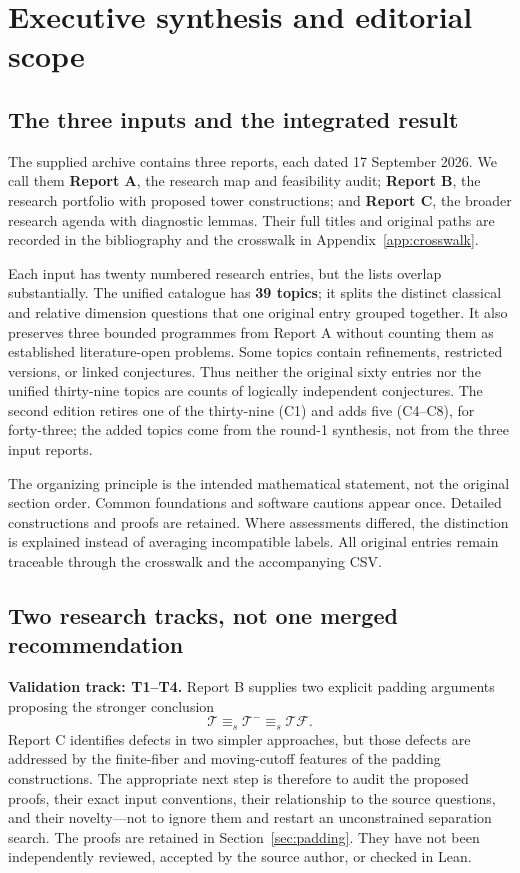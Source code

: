 \documentclass[11pt,a4paper]{article}
\newcommand{\T}{\mathcal T}\newcommand{\TF}{\mathcal{TF}}\newcommand{\Tw}{\mathcal T^{-}}
\theoremstyle{definition}\newtheorem{definition}[theorem]{Definition}
\theoremstyle{remark}\newtheorem{remark}[theorem]{Remark}
\begin{document}
{\small\tableofcontents}
\newpage


\section{Executive synthesis and editorial scope}
\label{sec:scope}
\subsection{The three inputs and the integrated result}
The supplied archive contains three reports, each dated 17 September 2026. We call them \textbf{Report A}, the research map and feasibility audit; \textbf{Report B}, the research portfolio with proposed tower constructions; and \textbf{Report C}, the broader research agenda with diagnostic lemmas. Their full titles and original paths are recorded in the bibliography and the crosswalk in Appendix~\ref{app:crosswalk}.\cite{ReportA,ReportB,ReportC}

Each input has twenty numbered research entries, but the lists overlap substantially. The unified catalogue has \textbf{39 topics}; it splits the distinct classical and relative dimension questions that one original entry grouped together. It also preserves three bounded programmes from Report A without counting them as established literature-open problems. Some topics contain refinements, restricted versions, or linked conjectures. Thus neither the original sixty entries nor the unified thirty-nine topics are counts of logically independent conjectures. The second edition retires one of the thirty-nine (C1) and adds five (C4--C8), for forty-three; the added topics come from the round-1 synthesis, not from the three input reports.

The organizing principle is the intended mathematical statement, not the original section order. Common foundations and software cautions appear once. Detailed constructions and proofs are retained. Where assessments differed, the distinction is explained instead of averaging incompatible labels. All original entries remain traceable through the crosswalk and the accompanying CSV.

\subsection{Two research tracks, not one merged recommendation}
\textbf{Validation track: T1--T4.} Report B supplies two explicit padding arguments proposing the stronger conclusion
\[
                  \T\equiv_s\Tw\equiv_s\TF.
\]
Report C identifies defects in two simpler approaches, but those defects are addressed by the finite-fiber and moving-cutoff features of the padding constructions. The appropriate next step is therefore to audit the proposed proofs, their exact input conventions, their relationship to the source questions, and their novelty---not to ignore them and restart an unconstrained separation search. The proofs are retained in Section~\ref{sec:padding}. They have not been independently reviewed, accepted by the source author, or checked in Lean.
\end{document}
